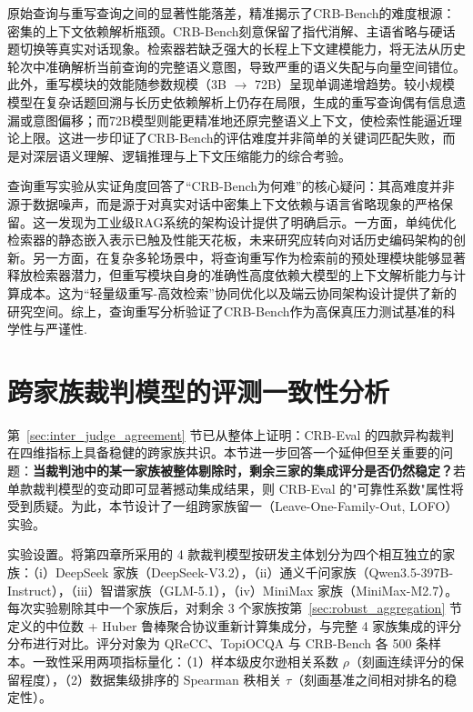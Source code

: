 原始查询与重写查询之间的显著性能落差，精准揭示了CRB-Bench的难度根源：密集的上下文依赖解析瓶颈。CRB-Bench刻意保留了指代消解、主语省略与硬话题切换等真实对话现象。检索器若缺乏强大的长程上下文建模能力，将无法从历史轮次中准确解析当前查询的完整语义意图，导致严重的语义失配与向量空间错位。此外，重写模块的效能随参数规模（3B $\to$ 72B）呈现单调递增趋势。较小规模模型在复杂话题回溯与长历史依赖解析上仍存在局限，生成的重写查询偶有信息遗漏或意图偏移；而72B模型则能更精准地还原完整语义上下文，使检索性能逼近理论上限。这进一步印证了CRB-Bench的评估难度并非简单的关键词匹配失败，而是对深层语义理解、逻辑推理与上下文压缩能力的综合考验。

查询重写实验从实证角度回答了“CRB-Bench为何难”的核心疑问：其高难度并非源于数据噪声，而是源于对真实对话中密集上下文依赖与语言省略现象的严格保留。这一发现为工业级RAG系统的架构设计提供了明确启示。一方面，单纯优化检索器的静态嵌入表示已触及性能天花板，未来研究应转向对话历史编码架构的创新。另一方面，在复杂多轮场景中，将查询重写作为检索前的预处理模块能够显著释放检索器潜力，但重写模块自身的准确性高度依赖大模型的上下文解析能力与计算成本。这为“轻量级重写-高效检索”协同优化以及端云协同架构设计提供了新的研究空间。综上，查询重写分析验证了CRB-Bench作为高保真压力测试基准的科学性与严谨性.

\section{跨家族裁判模型的评测一致性分析}
\label{sec:lofo_judge_family}

第~\ref{sec:inter_judge_agreement} 节已从整体上证明：CRB-Eval 的四款异构裁判在四维指标上具备稳健的跨家族共识。本节进一步回答一个延伸但至关重要的问题：\textbf{当裁判池中的某一家族被整体剔除时，剩余三家的集成评分是否仍然稳定？}若单款裁判模型的变动即可显著撼动集成结果，则 CRB-Eval 的"可靠性系数"属性将受到质疑。为此，本节设计了一组跨家族留一（Leave-One-Family-Out, LOFO）实验。

实验设置。将第四章所采用的 4 款裁判模型按研发主体划分为四个相互独立的家族：（i）DeepSeek 家族（DeepSeek-V3.2），（ii）通义千问家族（Qwen3.5-397B-Instruct），（iii）智谱家族（GLM-5.1），（iv）MiniMax 家族（MiniMax-M2.7）。每次实验剔除其中一个家族后，对剩余 3 个家族按第~\ref{sec:robust_aggregation} 节定义的中位数 + Huber 鲁棒聚合协议重新计算集成分，与完整 4 家族集成的评分分布进行对比。评分对象为 QReCC、TopiOCQA 与 CRB-Bench 各 500 条样本。一致性采用两项指标量化：（1）样本级皮尔逊相关系数 $\rho$（刻画连续评分的保留程度），（2）数据集级排序的 Spearman 秩相关 $\tau$（刻画基准之间相对排名的稳定性）。

